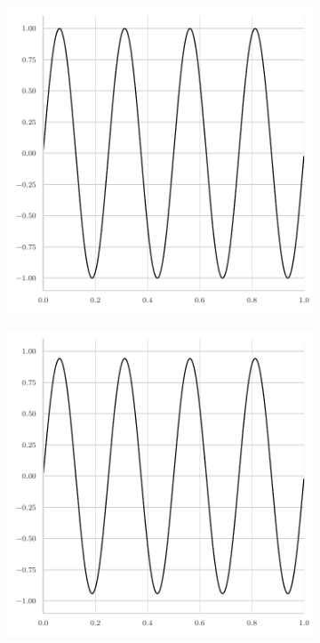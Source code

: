 \begin{figure}
	\centering
	\begin{subfigure}[b]{0.45\textwidth}
		\centering
		\includegraphics[width=\textwidth]{figures/initial_error_gauss_seidel_8pi.pdf}
	\end{subfigure}
	\hfill
	\begin{subfigure}[b]{0.45\textwidth}
		\centering
		\includegraphics[width=\textwidth]{figures/final_error_gauss_seidel_8pi.pdf}

\end{subfigure}
\end{figure}
